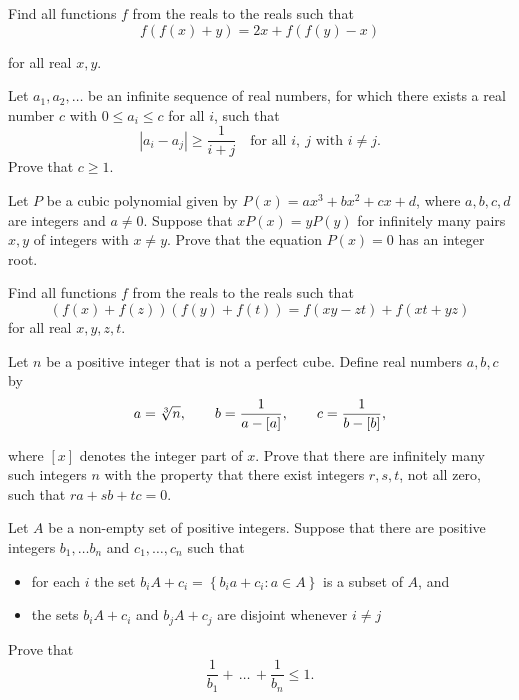 \item[\textbf{A1.}]Find all functions $f$ from the reals to the reals such that\[f\left(f(x)+y\right)=2x+f\left(f(y)-x\right)\]

for all real $x,y$.

\item[\textbf{A2.}]Let $a_1,a_2,\ldots$ be an infinite sequence of real numbers, for which there exists a real number $c$ with $0\leq a_i\leq c$ for all $i$,  such that \[\left\lvert a_i-a_j \right\rvert\geq \frac{1}{i+j} \quad \text{for all }i,\ j \text{ with } i \neq j. \] Prove that $c\geq1$.

\item[\textbf{A3.}]Let $P$ be a cubic polynomial given by $P(x)=ax^3+bx^2+cx+d$,  where $a,b,c,d$ are integers and $a\ne0$. Suppose that $xP(x)=yP(y)$ for infinitely many pairs $x,y$ of integers with $x\ne y$. Prove that the equation $P(x)=0$ has an integer root.

\item[\textbf{A4.}]Find all functions $f$ from the reals to the reals such that \[ \left(f(x)+f(z)\right)\left(f(y)+f(t)\right)=f(xy-zt)+f(xt+yz)  \] for all real $x,y,z,t$.

\item[\textbf{A5.}]Let $n$ be a positive integer that is not a perfect cube. Define real numbers $a,b,c$ by\[a=\root3\of n,\qquad b={\frac{1}{a-[a]}},\qquad c={\frac{1}{b-[b]}},\]

where $[x]$ denotes the integer part of $x$. Prove that there are infinitely many such integers $n$ with the property that there exist integers $r,s,t$,  not all zero, such that $ra+sb+tc=0$.

\item[\textbf{A6.}]Let $A$ be a non-empty set of positive integers. Suppose that there are positive integers $b_1,\ldots b_n$ and $c_1,\ldots,c_n$ such that

\begin{itemize}
\item for each $i$ the set $b_iA+c_i=\left\{b_ia+c_i\colon a\in A\right\}$ is a subset of $A$,  and
\item the sets $b_iA+c_i$ and $b_jA+c_j$ are disjoint whenever $i\ne j$
\end{itemize}

Prove that \[{\frac{1}{b_1}}+\,\ldots\,+{\frac{1}{b_n}}\leq1.\]

